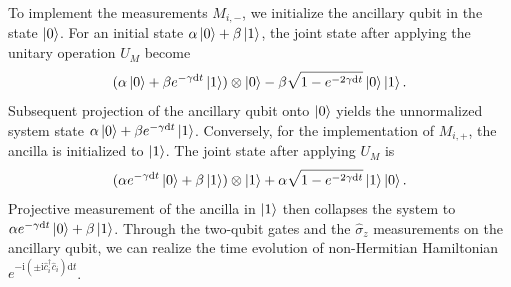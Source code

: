 \documentclass[longbibliography, aps, prx, amsmath, amssymb, amsfonts, twocolumn,superscriptaddress, footinbib]{revtex4-1}
\begin{document}
	To implement the measurements $M_{i,-}$, we initialize the ancillary qubit in the state $\ket{0}$. For an initial state $\alpha \ket{0} + \beta \ket{1}$, the joint state after applying the unitary operation $U_M$ become
	\begin{equation}
		(\alpha \ket{0} + \beta e^{-\gamma \mathrm{d}t} \ket{1}) \otimes \ket{0} - \beta \sqrt{1-e^{-2\gamma\mathrm{d}t}} \ket{0} \ket{1}.
	\end{equation}
	Subsequent projection of the ancillary qubit onto $\ket{0}$ yields the unnormalized system state $\alpha \ket{0} + \beta e^{-\gamma \mathrm{d}t} \ket{1}$. 
	Conversely, for the implementation of $M_{i,+}$, the ancilla is initialized to $\ket{1}$. The joint state after applying $U_M$ is
	\begin{equation}
		(\alpha e^{-\gamma \mathrm{d}t} \ket{0} + \beta  \ket{1}) \otimes \ket{1} + \alpha \sqrt{1-e^{-2\gamma\mathrm{d}t}} \ket{1} \ket{0}.
	\end{equation}
	Projective measurement of the ancilla in $\ket{1}$ then collapses the system to $\alpha e^{-\gamma \mathrm{d}t} \ket{0} + \beta  \ket{1}$.
	Through the two-qubit gates and the $\hat{\sigma}_z$ measurements on the ancillary qubit, we can realize the time evolution  of non-Hermitian Hamiltonian $e^{-\mathrm{i} (\pm \mathrm{i} \hat{c}_i^{\dagger}\hat{c}_i) \mathrm{d}t}$.
\end{document}
